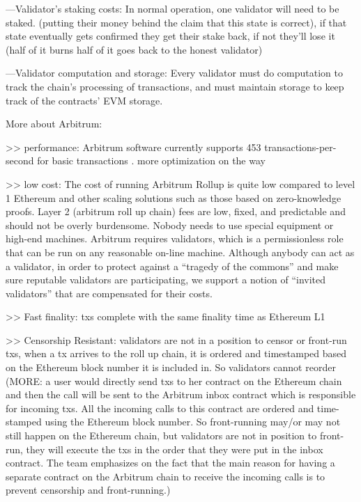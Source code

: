 ---Validator’s staking costs: In normal operation, one validator will need to be staked. (putting their money behind the claim that this state is correct), if that state eventually gets confirmed they get their stake back, if not they'll lose it (half of it burns half of it goes back to the honest validator)

---Validator computation and storage: Every validator must do computation to track the chain’s processing of transactions, and must maintain storage to keep track of the contracts’ EVM storage.




More about Arbitrum:

>> performance: Arbitrum software currently supports 453 transactions-per-second for basic transactions . more optimization on the way

>> low cost: The cost of running Arbitrum Rollup is quite low compared to level 1 Ethereum and other scaling solutions such as those based on zero-knowledge proofs. Layer 2 (arbitrum roll up chain) fees are low, fixed, and predictable and should not be overly burdensome. Nobody needs to use special equipment or high-end machines. Arbitrum requires validators, which is a permissionless role that can be run on any reasonable on-line machine. Although anybody can act as a validator, in order to protect against a “tragedy of the commons” and make sure reputable validators are participating, we support a notion of “invited validators” that are compensated for their costs. 

>> Fast finality: txs complete with the same finality time as Ethereum L1

>> Censorship Resistant: validators are not in a position to censor or front-run txs, when a tx arrives to the roll up chain, it is ordered and timestamped based on the Ethereum block number it is included in. So validators cannot reorder (MORE: a user would directly send txs to her contract on the Ethereum chain and then the call will be sent to the Arbitrum inbox contract which is responsible for incoming txs. All the incoming calls to this contract are ordered and time-stamped using the Ethereum block number. So front-running may/or may not still happen on the Ethereum chain, but validators are not in position to front-run, they will execute the txs in the order that they were put in the inbox contract. The team emphasizes on the fact that the main reason for having a separate contract on the Arbitrum chain to receive the incoming calls is to prevent censorship and front-running.)





